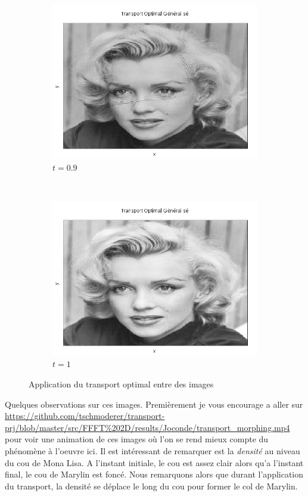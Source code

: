 \documentclass[a4paper,12pt]{article}
\begin{document}
\begin{figure}[!h]
\begin{subfigure}[b]{0.23\linewidth}
\includegraphics[width=\linewidth]{img/2DMorphing/T_00199.png}
\caption*{$t=0.9$}
\end{subfigure}
~
\begin{subfigure}[b]{0.23\linewidth}
\includegraphics[width=\linewidth]{img/2DMorphing/T_00202.png}
\caption*{$t=1$}
\end{subfigure}

\caption{Application du transport optimal entre des images}
\end{figure}
\newpage
Quelques observations sur ces images. Premièrement je vous encourage a aller sur \url{https://github.com/tschmoderer/transport-prj/blob/master/src/FFFT%202D/results/Joconde/transport_morphing.mp4} pour voir une animation de ces images où l'on se rend mieux compte du phénomène à l'oeuvre ici.
Il est intéressant de remarquer est la \emph{densité} au niveau du cou de Mona Lisa. A l'instant initiale, le cou est assez clair alors qu'a l'instant final, le cou de Marylin est foncé. Nous remarquons alors que durant l'application du transport, la densité se déplace le long du cou pour former le col de Marylin.  
\end{document}
